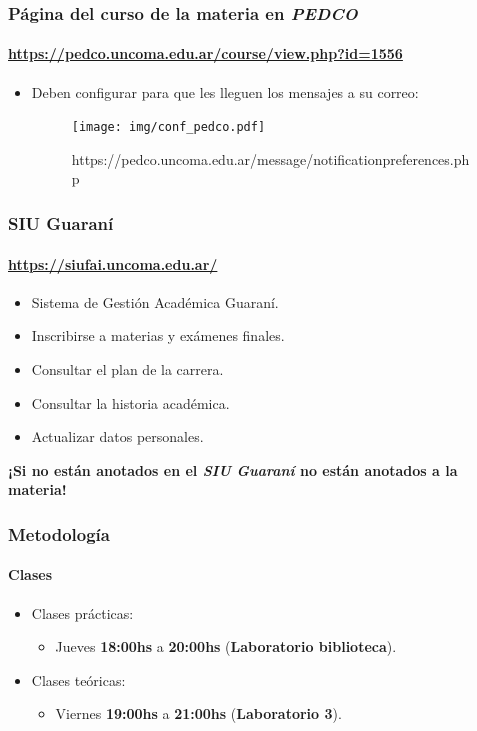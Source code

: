 \documentclass[11pt,a4paper,spanish]{beamer}
\begin{document}
\begin{frame}

    \frametitle{Página del curso de la materia en \emph{PEDCO}}
    \framesubtitle{\url{https://pedco.uncoma.edu.ar/course/view.php?id=1556}}

\begin{itemize}
    \item Deben configurar para que les lleguen los mensajes a su correo:
    \begin{figure}
        \texttt{[image: img/conf\_pedco.pdf]}
        \captionsetup{textfont=tiny,labelformat=empty}
        \caption{\url{}https://pedco.uncoma.edu.ar/message/notificationpreferences.php}
    \end{figure}
\end{itemize}

\end{frame}

\begin{frame}

    \frametitle{SIU Guaraní}
    \framesubtitle{\url{https://siufai.uncoma.edu.ar/}}

\begin{itemize}
    \item Sistema de Gestión Académica Guaraní.
    \item Inscribirse a materias y exámenes finales.
    \item Consultar el plan de la carrera.
    \item Consultar la historia académica.
    \item Actualizar datos personales.
\end{itemize}

\textbf{¡Si no están anotados en el \emph{SIU Guaraní} no están anotados a la
    materia!}

\end{frame}

\begin{frame}

    \frametitle{Metodología}
    \framesubtitle{Clases}

\begin{itemize}
    \item Clases prácticas:
    \begin{itemize}
        \item Jueves \textbf{18:00hs} a \textbf{20:00hs} (\textbf{Laboratorio
            biblioteca}).
    \end{itemize}
    \item Clases teóricas:
    \begin{itemize}
        \item Viernes \textbf{19:00hs} a \textbf{21:00hs} (\textbf{Laboratorio
            3}).
    \end{itemize}

\end{itemize}

\end{frame}
\end{document}
